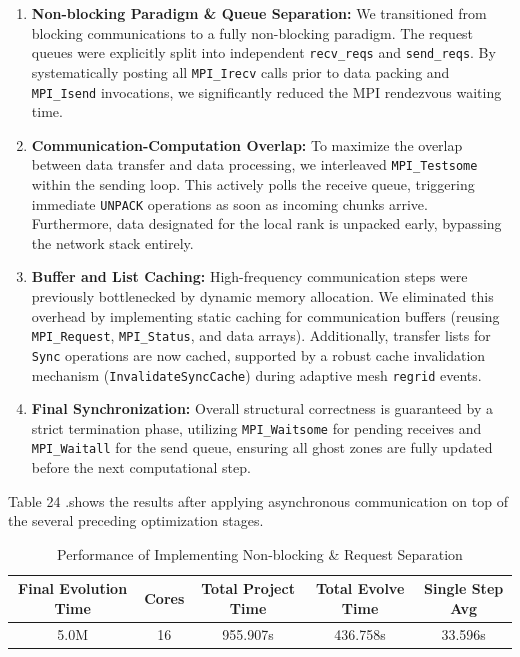\begin{enumerate}
    \item \textbf{Non-blocking Paradigm \& Queue Separation:} We transitioned from blocking communications to a fully non-blocking paradigm. 
    The request queues were explicitly split into independent \texttt{recv\_reqs} and \texttt{send\_reqs}. 
    By systematically posting all \texttt{MPI\_Irecv} calls prior to data packing and \texttt{MPI\_Isend} invocations, we significantly reduced the MPI rendezvous waiting time.
    
    \item \textbf{Communication-Computation Overlap:} To maximize the overlap between data transfer and data processing, we interleaved \texttt{MPI\_Testsome} within the sending loop. 
    This actively polls the receive queue, triggering immediate \texttt{UNPACK} operations as soon as incoming chunks arrive. 
    Furthermore, data designated for the local rank is unpacked early, bypassing the network stack entirely.
    
    \item \textbf{Buffer and List Caching:} High-frequency communication steps were previously bottlenecked by dynamic memory allocation. 
    We eliminated this overhead by implementing static caching for communication buffers (reusing \texttt{MPI\_Request}, \texttt{MPI\_Status}, and data arrays). 
    Additionally, transfer lists for \texttt{Sync} operations are now cached, supported by a robust cache invalidation mechanism (\texttt{InvalidateSyncCache}) during adaptive mesh \texttt{regrid} events.
    
    \item \textbf{Final Synchronization:} Overall structural correctness is guaranteed by a strict termination phase, utilizing \texttt{MPI\_Waitsome} for pending receives and \texttt{MPI\_Waitall} for the send queue, ensuring all ghost zones are fully updated before the next computational step.
\end{enumerate}
Table 24 .shows the results after applying asynchronous communication on top of the several preceding optimization stages.
\begin{table}[h]
    \centering
    \caption{Performance of Implementing Non-blocking \& Request Separation }
    \small %
    \begin{tabular}{|c|c|c|c|c|}
        \hline
        \textbf{Final Evolution Time }& \textbf{Cores} & \textbf{Total Project Time} &\textbf{Total Evolve Time} & \textbf{Single Step Avg} \\ \hline
        5.0M & 16 & 955.907s &436.758s & 33.596s \\ \hline
    \end{tabular}
\end{table}
